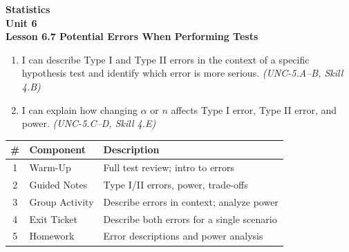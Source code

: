 \documentclass[10pt]{article}
\begin{document}
\vspace{-0.8in}

\begin{center}
  {\color{white}\textbf{\LARGE Statistics}}\\[4pt]
  {\color{skymid}\large\textbf{Unit 6}}\\[6pt]
  {\color{white}\textbf{\large Lesson 6.7 \quad Potential Errors When Performing Tests}}
\end{center}

\vspace{0.22in}
\namedateperiod
\vspace{0.18in}

\begin{learningtargetbox}
\small
\begin{enumerate}[leftmargin=1.5em, itemsep=5pt]
  \item I can describe Type I and Type II errors in the context of a specific hypothesis test and identify which error is more serious. \textit{(UNC-5.A--B, Skill 4.B)}
  \item I can explain how changing $\alpha$ or $n$ affects Type I error, Type II error, and power. \textit{(UNC-5.C--D, Skill 4.E)}
\end{enumerate}
\end{learningtargetbox}

\vspace{0.14in}

\begin{tocbox}
\small
\renewcommand{\arraystretch}{1.5}
\begin{tabularx}{\linewidth}{@{} c l X @{}}
\rowcolor{sky}
\textbf{\#} & \textbf{Component} & \textbf{Description} \\
\midrule
1 & Warm-Up        & Full test review; intro to errors \\
2 & Guided Notes   & Type I/II errors, power, trade-offs \\
3 & Group Activity & Describe errors in context; analyze power \\
4 & Exit Ticket    & Describe both errors for a single scenario \\
5 & Homework       & Error descriptions and power analysis \\
\end{tabularx}
\end{tocbox}
\end{document}
